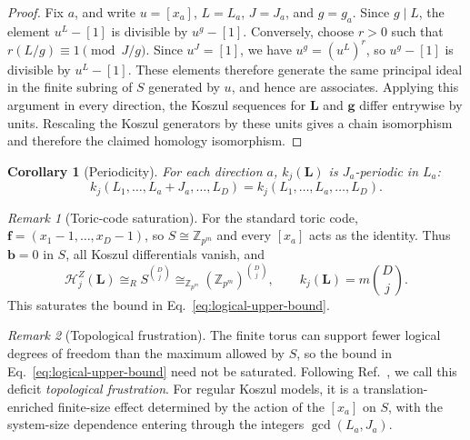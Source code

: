 \documentclass[aps,prx,english,superscriptaddress,twocolumn,tightenlines,showpacs,longbibliography,floatfix,amsfonts]{revtex4-2}
\newtheorem{corollary}{Corollary}
\theoremstyle{remark}
\newtheorem{remark}{Remark}
\theoremstyle{definition}
\begin{document}
\begin{proof}
	Fix \(a\), and write \(u=[x_a]\), \(L=L_a\), \(J=J_a\), and
	\(g=g_a\). Since \(g\mid L\), the element \(u^L-[1]\) is divisible by
	\(u^g-[1]\). Conversely, choose \(r>0\) such that
	\(r(L/g)\equiv1\pmod{J/g}\). Since \(u^J=[1]\), we have
	\(u^g=(u^L)^r\), so \(u^g-[1]\) is divisible by \(u^L-[1]\).
	These elements therefore generate the same principal ideal in the finite
	subring of \(S\) generated by \(u\), and hence are associates. Applying
	this argument in every direction, the Koszul sequences for
	\(\mathbf L\) and \(\mathbf g\) differ entrywise by units. Rescaling the
	Koszul generators by these units gives a chain isomorphism and therefore
	the claimed homology isomorphism.
\end{proof}

\begin{corollary}[Periodicity]
	\label{cor:logical-periodicity}
	For each direction \(a\), \(k_j(\mathbf L)\) is \(J_a\)-periodic in
	\(L_a\):
	\begin{equation}
		k_j(L_1,\dots,L_a+J_a,\dots,L_D)
		=
		k_j(L_1,\dots,L_a,\dots,L_D).
		\label{eq:logical-coordinate-periodicity}
	\end{equation}
\end{corollary}

\begin{remark}[Toric-code saturation]
	\label{rem:toric-saturation}
	For the standard toric code,
	\(\mathbf f=(x_1-1,\dots,x_D-1)\), so
	\(S\cong\mathbb Z_{p^m}\) and every \([x_a]\) acts as the identity.
	Thus \(\mathbf b=0\) in \(S\), all Koszul differentials vanish, and
	\begin{equation}
		\mathcal H_j^Z(\mathbf L)
		\cong_R S^{\binom{D}{j}}
		\cong_{\mathbb Z_{p^m}}(\mathbb Z_{p^m})^{\binom{D}{j}},
		\qquad
		k_j(\mathbf L)=m\binom{D}{j}.
		\label{eq:toric-logical-saturation}
	\end{equation}
	This saturates the bound in Eq.~\eqref{eq:logical-upper-bound}.
\end{remark}

\begin{remark}[Topological frustration]
	\label{rem:topological-frustration}
	The finite torus can support fewer logical degrees of freedom than the
	maximum allowed by \(S\), so the bound in
	Eq.~\eqref{eq:logical-upper-bound} need not be saturated. Following
	Ref.~\cite{Chen2025PRL}, we call this deficit
	\emph{topological frustration}.
	For regular Koszul models, it is a translation-enriched finite-size effect
	determined by the action of the \([x_a]\) on \(S\), with the system-size
	dependence entering through the integers \(\gcd(L_a,J_a)\).
\end{remark}
\end{document}
